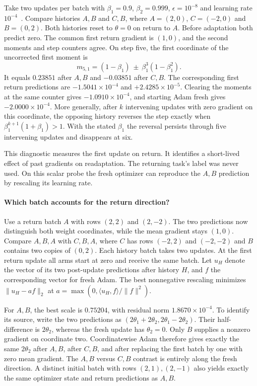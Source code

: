 \documentclass[11pt,a4paper]{article}
\begin{document}
Take two updates per batch with $\beta_1=0.9$, $\beta_2=0.999$,
$\epsilon=10^{-8}$ and learning rate $10^{-4}$~\cite{adam}.
Compare histories $A,B$ and $C,B$, where $A=(2,0)$, $C=(-2,0)$ and
$B=(0,2)$. Both histories reset to $\theta=0$ on return to $A$.
Before adaptation both predict zero. The common first return gradient
is $(1,0)$, and the second moments and step counters agree. On step five,
the first coordinate of the uncorrected first moment is
\[
 m_{5,1}=(1-\beta_1)\ \mathbin{\pm}\ \beta_1^3(1-\beta_1^2).
\]
It equals $0.23851$ after $A,B$ and $-0.03851$ after $C,B$.
The corresponding first return predictions are $-1.5041\times10^{-4}$
and $+2.4285\times10^{-5}$. Clearing the moments at the same counter
gives $-1.0910\times10^{-4}$, and starting Adam fresh gives
$-2.0000\times10^{-4}$. More generally, after $k$ intervening updates
with zero gradient on this coordinate, the opposing history reverses
the step exactly when $\beta_1^{k+1}(1+\beta_1)>1$. With the stated
$\beta_1$ the reversal persists through five intervening updates and
disappears at six.

This diagnostic measures the first update on return. It identifies a
short-lived effect of past gradients on readaptation. The returning
task's label was never used. On this scalar probe the fresh optimizer
can reproduce the $A,B$ prediction by rescaling its learning rate.

\paragraph{Which batch accounts for the return direction?}
Use a return batch $A$ with rows $(2,2)$ and $(2,-2)$. The two predictions
now distinguish both weight coordinates, while the mean gradient stays
$(1,0)$. Compare $A,B,A$ with $C,B,A$, where $C$ has rows $(-2,2)$
and $(-2,-2)$ and $B$ contains two copies of $(0,2)$. Each history batch
takes two updates. At the first return update all arms start at zero and
receive the same batch. Let $u_H$ denote the vector of its two post-update
predictions after history $H$, and $f$ the corresponding vector for fresh
Adam. The best nonnegative rescaling minimizes $\|u_H-a f\|_2$ at
$a=\max(0,\langle u_H,f\rangle/\|f\|^2)$.

For $A,B$, the best scale is $0.75204$, with residual norm
$1.8670\times10^{-4}$. To identify its source, write the two predictions
as $(2\theta_1+2\theta_2,2\theta_1-2\theta_2)$. Their half-difference
is $2\theta_2$, whereas the fresh update has $\theta_2=0$. Only $B$
supplies a nonzero gradient on coordinate two. Coordinatewise Adam
therefore gives exactly the same $2\theta_2$ after $A,B$, after $C,B$,
and after replacing the first batch by one with zero mean gradient.
The $A,B$ versus $C,B$ contrast is entirely along the fresh direction.
A distinct initial batch with rows $(2,1),(2,-1)$ also yields exactly
the same optimizer state and return predictions as $A,B$.
\end{document}
